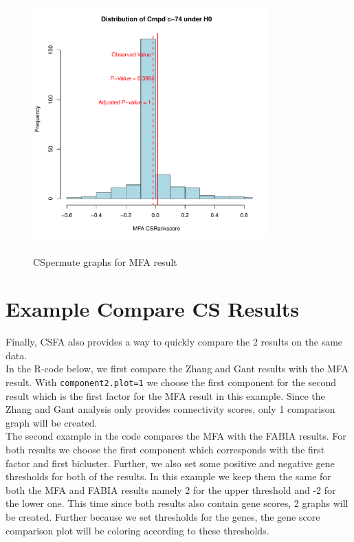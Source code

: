 \documentclass[a4paper]{article}\usepackage[]{graphicx}\usepackage[]{color}
\newenvironment{knitrout}{}{} %
\begin{document}
\begin{knitrout}
\begin{figure}[H]
\includegraphics[width=9cm,height=10cm]{figure/CSpermuteplots2-3} \hfill{}

\caption[CSpermute graphs for MFA result]{CSpermute graphs for MFA result\label{fig:CSpermuteplots2}}
\end{figure}


\end{knitrout}

\section{Example Compare CS Results}
Finally, CSFA also provides a way to quickly compare the 2 results on the same
data.\\
In the R-code below, we first compare the Zhang and Gant results with the MFA
result. With \texttt{component2.plot=1} we choose the first component for the
second result which is the first factor for the MFA result in this example.
Since the Zhang and Gant analysis only provides connectivity scores, only 1
comparison graph will be created.\\
The second example in the code compares the MFA with the FABIA results. For both
results we choose the first component which corresponds with the first factor
and first bicluster. Further, we also set some positive and negative gene
thresholds for both of the results. In this example we keep them the same for
both the MFA and FABIA results namely 2 for the upper threshold and -2 for the
lower one. This time since both results also contain gene scores, 2 graphs will
be created. Further because we set thresholds for the genes, the gene score
comparison plot will be coloring according to these thresholds.
\end{document}
